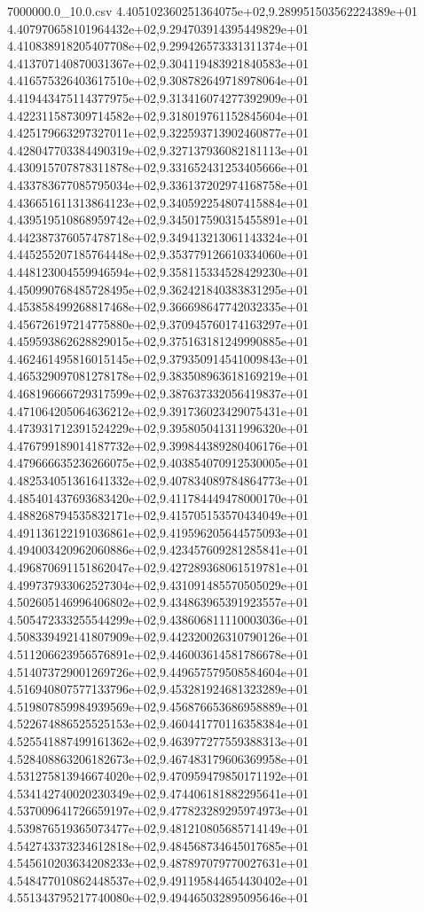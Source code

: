 \begin{filecontents*}{7000000.0_10.0.csv}
4.405102360251364075e+02,9.289951503562224389e+01
4.407970658101964432e+02,9.294703914395449829e+01
4.410838918205407708e+02,9.299426573331311374e+01
4.413707140870031367e+02,9.304119483921840583e+01
4.416575326403617510e+02,9.308782649718978064e+01
4.419443475114377975e+02,9.313416074277392909e+01
4.422311587309714582e+02,9.318019761152845604e+01
4.425179663297327011e+02,9.322593713902460877e+01
4.428047703384490319e+02,9.327137936082181113e+01
4.430915707878311878e+02,9.331652431253405666e+01
4.433783677085795034e+02,9.336137202974168758e+01
4.436651611313864123e+02,9.340592254807415884e+01
4.439519510868959742e+02,9.345017590315455891e+01
4.442387376057478718e+02,9.349413213061143324e+01
4.445255207185764448e+02,9.353779126610334060e+01
4.448123004559946594e+02,9.358115334528429230e+01
4.450990768485728495e+02,9.362421840383831295e+01
4.453858499268817468e+02,9.366698647742032335e+01
4.456726197214775880e+02,9.370945760174163297e+01
4.459593862628829015e+02,9.375163181249990885e+01
4.462461495816015145e+02,9.379350914541009843e+01
4.465329097081278178e+02,9.383508963618169219e+01
4.468196666729317599e+02,9.387637332056419837e+01
4.471064205064636212e+02,9.391736023429075431e+01
4.473931712391524229e+02,9.395805041311996320e+01
4.476799189014187732e+02,9.399844389280406176e+01
4.479666635236266075e+02,9.403854070912530005e+01
4.482534051361641332e+02,9.407834089784864773e+01
4.485401437693683420e+02,9.411784449478000170e+01
4.488268794535832171e+02,9.415705153570434049e+01
4.491136122191036861e+02,9.419596205644575093e+01
4.494003420962060886e+02,9.423457609281285841e+01
4.496870691151862047e+02,9.427289368061519781e+01
4.499737933062527304e+02,9.431091485570505029e+01
4.502605146996406802e+02,9.434863965391923557e+01
4.505472333255544299e+02,9.438606811110003036e+01
4.508339492141807909e+02,9.442320026310790126e+01
4.511206623956576891e+02,9.446003614581786678e+01
4.514073729001269726e+02,9.449657579508584604e+01
4.516940807577133796e+02,9.453281924681323289e+01
4.519807859984939569e+02,9.456876653686958889e+01
4.522674886525525153e+02,9.460441770116358384e+01
4.525541887499161362e+02,9.463977277559388313e+01
4.528408863206182673e+02,9.467483179606369958e+01
4.531275813946674020e+02,9.470959479850171192e+01
4.534142740020230349e+02,9.474406181882295641e+01
4.537009641726659197e+02,9.477823289295974973e+01
4.539876519365073477e+02,9.481210805685714149e+01
4.542743373234612818e+02,9.484568734645017685e+01
4.545610203634208233e+02,9.487897079770027631e+01
4.548477010862448537e+02,9.491195844654430402e+01
4.551343795217740080e+02,9.494465032895095646e+01

\end{filecontents*}
